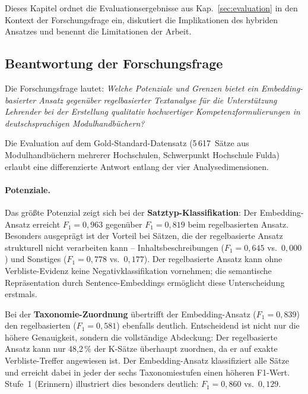 
Dieses Kapitel ordnet die Evaluationsergebnisse aus Kap.~\ref{sec:evaluation} in den Kontext der Forschungsfrage ein, diskutiert die Implikationen des hybriden Ansatzes und benennt die Limitationen der Arbeit.

\subsection{Beantwortung der Forschungsfrage}\label{sec:beantwortung}

Die Forschungsfrage lautet: \textit{Welche Potenziale und Grenzen bietet ein Embedding-basierter Ansatz gegenüber regelbasierter Textanalyse für die Unterstützung Lehrender bei der Erstellung qualitativ hochwertiger Kompetenzformulierungen in deutschsprachigen Modulhandbüchern?}

Die Evaluation auf dem Gold-Standard-Datensatz (5\,617~Sätze aus Modulhandbüchern mehrerer Hochschulen, Schwerpunkt Hochschule Fulda) erlaubt eine differenzierte Antwort entlang der vier Analysedimensionen.

\paragraph{Potenziale.}
Das größte Potenzial zeigt sich bei der \textbf{Satztyp-Klassifikation}: Der Embedding-Ansatz erreicht $F_1 = 0{,}963$ gegenüber $F_1 = 0{,}819$ beim regelbasierten Ansatz.
Besonders ausgeprägt ist der Vorteil bei Sätzen, die der regelbasierte Ansatz strukturell nicht verarbeiten kann -- Inhaltsbeschreibungen ($F_1 = 0{,}645$ vs.\ $0{,}000$) und Sonstiges ($F_1 = 0{,}778$ vs.\ $0{,}177$).
Der regelbasierte Ansatz kann ohne Verbliste-Evidenz keine Negativklassifikation vornehmen; die semantische Repräsentation durch Sentence-Embeddings ermöglicht diese Unterscheidung erstmals.

Bei der \textbf{Taxonomie-Zuordnung} übertrifft der Embedding-Ansatz ($F_1 = 0{,}839$) den regelbasierten ($F_1 = 0{,}581$) ebenfalls deutlich.
Entscheidend ist nicht nur die höhere Genauigkeit, sondern die vollständige Abdeckung: Der regelbasierte Ansatz kann nur 48{,}2\,\% der K-Sätze überhaupt zuordnen, da er auf exakte Verbliste-Treffer angewiesen ist.
Der Embedding-Ansatz klassifiziert alle Sätze und erreicht dabei in jeder der sechs Taxonomiestufen einen höheren F1-Wert.
Stufe~1 (Erinnern) illustriert dies besonders deutlich: $F_1 = 0{,}860$ vs.\ $0{,}129$.

